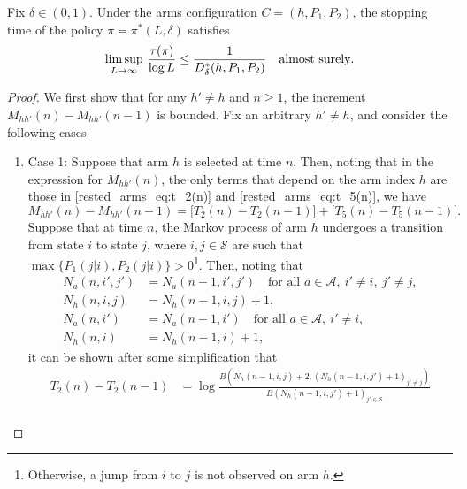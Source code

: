 \begin{lemma}\label{rested_arms_lemma:almost_sure_upper_bound_for_policy_pi_star}
Fix $\delta\in(0,1)$. Under the arms configuration $C=(h,P_1,P_2)$, the stopping time of the policy $\pi=\pi^*(L,\delta)$ satisfies 
\begingroup\allowdisplaybreaks\begin{align}
	\limsup\limits_{L\to\infty}\, \frac{\tau(\pi)}{\log L}\leq  \frac{1}{D_\delta^*(h,P_1,P_2)}\quad \text{\text{almost surely}}.\label{rested_arms_eq:almost_sure_upper_bound_for_policy_pi_star}
\end{align}\endgroup	
\end{lemma}
\begin{proof}
We first show that for any $h'\neq h$ and $n\geq 1$, the increment $M_{hh'}(n)-M_{hh'}(n-1)$ is bounded. Fix an arbitrary $h'\neq h$, and consider the following cases.
	\begin{enumerate}
		\item Case 1: Suppose that arm $h$ is selected at time $n$. Then, noting that in the expression for $M_{hh'}(n)$, the only terms that depend on the arm index $h$ are those in \eqref{rested_arms_eq:t_2(n)} and \eqref{rested_arms_eq:t_5(n)}, we have
		    \begin{equation}
		    	M_{hh'}(n)-M_{hh'}(n-1)=\bigg[T_2(n)-T_2(n-1)\bigg] + \bigg[T_5(n)-T_5(n-1)\bigg].\label{rested_arms_eq:mod_glr_bdd_incr_1}
		    \end{equation}
		    Suppose that at time $n$, the Markov process of arm $h$ undergoes a transition from state $i$ to state $j$, where $i,j\in\mathcal{S}$ are such that $\max\{P_1(j|i),P_2(j|i)\}>0$\footnote{Otherwise, a jump from $i$ to $j$ is not observed on arm $h$.}. Then, noting that
		    \begingroup\allowdisplaybreaks\begin{align}
		    	N_a(n,i',j')&=N_a(n-1,i',j')\quad \text{for all }a\in\mathcal{A},~i'\neq i,~j'\neq j,\nonumber\\
		    	N_h(n,i,j)&=N_h(n-1,i,j)+1,\nonumber\\
		    	N_a(n,i')& =N_a(n-1,i')\quad \text{for all }a\in\mathcal{A},~i'\neq i,\nonumber\\
		    	N_h(n,i)&=N_h(n-1,i)+1,
		    \end{align}\endgroup
		    it can be shown after some simplification that
		    \begingroup\allowdisplaybreaks\begin{align}
		    	T_2(n)-T_2(n-1)&=\log\frac{B(N_h(n-1,i,j)+2,(N_h(n-1,i,j')+1)_{j'\neq j})}{B(N_h(n-1,i,j')+1)_{j'\in\mathcal{S}}}\nonumber\\

\end{align}
\end{enumerate}
\end{proof}
